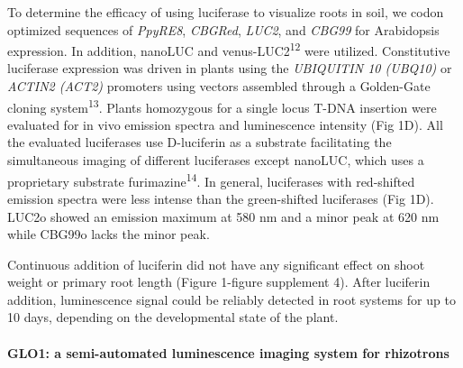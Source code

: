 \documentclass[]{article}
\begin{document}
To determine the efficacy of using luciferase to visualize roots in
soil, we codon optimized sequences of \emph{PpyRE8}, \emph{CBGRed},
\emph{LUC2}, and \emph{CBG99} for Arabidopsis expression. In addition,
nanoLUC and venus-LUC2\textsuperscript{12} were utilized. Constitutive
luciferase expression was driven in plants using the \emph{UBIQUITIN 10
(UBQ10)} or \emph{ACTIN2 (ACT2)} promoters using vectors assembled
through a Golden-Gate cloning system\textsuperscript{13}. Plants
homozygous for a single locus T-DNA insertion were evaluated for in vivo
emission spectra and luminescence intensity (Fig 1D). All the evaluated
luciferases use D-luciferin as a substrate facilitating the simultaneous
imaging of different luciferases except nanoLUC, which uses a
proprietary substrate furimazine\textsuperscript{14}. In general,
luciferases with red-shifted emission spectra were less intense than the
green-shifted luciferases (Fig 1D). LUC2o showed an emission maximum at
580 nm and a minor peak at 620 nm while CBG99o lacks the minor peak.

Continuous addition of luciferin did not have any significant effect on
shoot weight or primary root length (Figure 1-figure supplement 4).
After luciferin addition, luminescence signal could be reliably detected
in root systems for up to 10 days, depending on the developmental state
of the plant.

\paragraph{GLO1: a semi-automated luminescence imaging system for
rhizotrons}\label{glo1-a-semi-automated-luminescence-imaging-system-for-rhizotrons}
\end{document}
